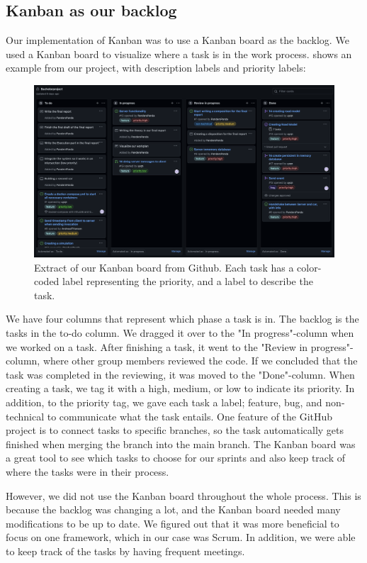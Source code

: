 \subsection{Kanban as our backlog}
Our implementation of Kanban was to use a Kanban board as the backlog. We used a Kanban board to visualize where a task is in the work process.  shows an example from our project, with description labels and priority labels:
\begin{figure}[h!]
	\centering
	\includegraphics[width=1\linewidth]{figures/kanban_screenshot}
	\caption[kanban screenshot]{Extract of our Kanban board from Github. Each task has a color-coded label representing the priority, and a label to describe the task.}
	\label{fig:kanbanscreenshot}
\end{figure}

We have four columns that represent which phase a task is in. The backlog is the tasks in the to-do column. We dragged it over to the "In progress"-column when we worked on a task. After finishing a task, it went to the "Review in progress"-column, where other group members reviewed the code. If we concluded that the task was completed in the reviewing, it was moved to the "Done"-column. When creating a task, we tag it with a high, medium, or low to indicate its priority. In addition, to the priority tag, we gave each task a label; feature, bug, and non-technical to communicate what the task entails. One feature of the GitHub project is to connect tasks to specific branches, so the task automatically gets finished when merging the branch into the main branch. The Kanban board was a great tool to see which tasks to choose for our sprints and also keep track of where the tasks were in their process. 

However, we did not use the Kanban board throughout the whole process. This is because the backlog was changing a lot, and the Kanban board needed many modifications to be up to date. We figured out that it was more beneficial to focus on one framework, which in our case was Scrum. In addition, we were able to keep track of the tasks by having frequent meetings. 